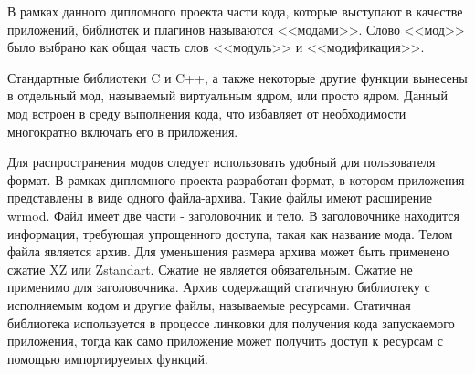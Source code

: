 В рамках данного дипломного проекта части кода, которые выступают в качестве приложений, библиотек и плагинов называются <<модами>>. 
Слово <<мод>> было выбрано как общая часть слов <<модуль>> и <<модификация>>.

Стандартные библиотеки C и C++, а также некоторые другие функции вынесены в отдельный мод, называемый виртуальным ядром, или просто ядром.
Данный мод встроен в среду выполнения кода, что избавляет от необходимости многократно включать его в приложения.

Для распространения модов следует использовать удобный для пользователя формат.
В рамках дипломного проекта разработан формат, в котором приложения представлены в виде одного файла-архива.
Такие файлы имеют расширение wrmod.
Файл имеет две части - заголовочник и тело.
В заголовочнике находится информация, требующая упрощенного доступа, такая как название мода.
Телом файла является архив.
Для уменьшения размера архива может быть применено сжатие XZ или Zstandart.
Сжатие не является обязательным.
Сжатие не применимо для заголовочника.
Архив содержащий статичную библиотеку с исполняемым кодом и другие файлы, называемые ресурсами.
Статичная библиотека используется в процессе линковки для получения кода запускаемого приложения, тогда как само приложение может получить доступ к ресурсам с помощью импортируемых функций.
